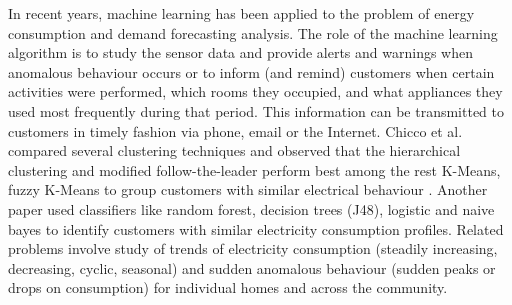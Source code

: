 \documentclass{sig-alternate}
\begin{document}
In recent years, machine learning has been applied to the problem of energy consumption and demand forecasting analysis. The role of the machine learning algorithm is to study the sensor data and provide alerts and warnings when anomalous behaviour occurs or to inform (and remind) customers when certain activities were performed, which rooms they occupied, and what appliances they used most frequently during that period. This information can be transmitted to customers in timely fashion via phone, email or the Internet.
Chicco et al. \cite{1626400} compared several clustering techniques and observed that the hierarchical clustering and modified follow-the-leader perform best among the rest K-Means, fuzzy K-Means to group customers with similar electrical behaviour \cite{5620917}. Another paper \cite{Wijaya} used classifiers like random forest, decision trees (J48), logistic and naive bayes to identify customers with similar electricity consumption profiles.
Related problems involve study of trends of electricity consumption (steadily increasing, decreasing, cyclic, seasonal) and sudden anomalous behaviour (sudden peaks or drops on consumption) for individual homes and across the community.\cite{Diane}
\end{document}
